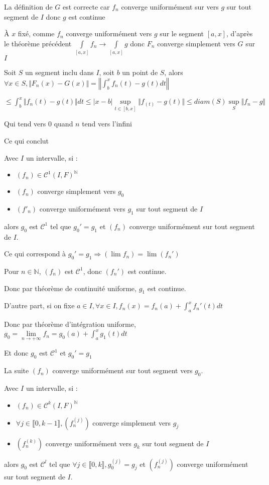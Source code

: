 \documentclass[a4paper,12pt]{book}
\newcommand{\Thr}[2]{\begin{tcolorbox}[sharp corners, colback=white,colframe=red!90!black!75, title=Théorème : #1]#2\end{tcolorbox}}
\newcommand{\Pre}[1]{\begin{tcolorbox}[sharp corners, colback=white,colframe=green!60!green!30!black!75, title=Preuve]#1\end{tcolorbox}}
\def\N{\mathbb{N}}
\begin{document}
\Pre{La définition de $G$ est correcte car $f_n$ converge uniformément sur vers $g$ sur tout segment de $I$ donc $g$ est continue
\par À $x$ fixé, comme $f_n$ converge uniformément vers $g$ sur le segment $[a,x]$, d'après le théorème précédent $\int\limits_{[a,x]}f_n\to \int\limits_{[a,x]}g$ donc $F_n$ converge simplement vers $G$ sur $I$
\par Soit $S$ un segment inclu dans $I$, soit $b$ un point de $S$, alors $\forall x\in S, \Vert F_n(x)-G(x)\Vert =\left\Vert\int_b^x f_n(t) - g(t) dt\right\Vert$ \par $\leq \int_b^x\Vert f_n(t)-g(t)\Vert dt\leq \vert x-b\vert \sup\limits_{t\in[b,x]}\Vert f_(t)-g(t)\Vert\leq diam(S)\sup\limits_{S}\Vert f_n-g\Vert$ \par Qui tend vers 0 quand $n$ tend vers l'infini \par Ce qui conclut}
\Thr{Dérivation uniforme des suites de fonctions}{Avec $I$ un intervalle, si :\begin{itemize}\item $(f_n)\in\mathcal{C}^1(I,F)^\N$ \item $(f_n)$ converge simplement vers $g_0$ \item $(f'_n)$ converge uniformément vers $g_1$ sur tout segment de $I$\end{itemize} alors $g_0$ est $\mathcal{C}^1$ tel que $g_0'=g_1$ et $(f_n)$ converge uniformément sur tout segment de $I$.
\par Ce qui correspond à $g_0'=g_1 \Rightarrow (\lim f_n)=\lim (f_n')$}
\Pre{Pour $n\in\N$, $(f_n)$ est $\mathcal{C}^1$, donc $(f_n')$ est continue. \par Donc par théorème de continuité uniforme, $g_1$ est continue. \par D'autre part, si on fixe $a\in I, \forall x\in I, f_n(x)=f_n(a)+\int_a^xf_n'(t)dt$ \par Donc par théorème d'intégration uniforme, $g_0=\lim\limits_{n\to+\infty}f_n=g_0(a)+\int_a^xg_1(t)dt$ \par Et donc $g_0$ est $\mathcal{C}^1$ et $g_0'=g_1$ \par La suite $(f_n)$ converge uniformément sur tout segment vers $g_0$.}
\Thr{Théorème de dérivation des suites à l'ordre k}{Avec $I$ un intervalle, si :\begin{itemize}\item $(f_n)\in\mathcal{C}^k(I,F)^\N$ \item $\forall j\in\llbracket0,k-1\rrbracket, (f_n^{(j)})$ converge simplement vers $g_j$ \item $(f_n^{(k)})$ converge uniformément vers $g_k$ sur tout segment de $I$\end{itemize} alors $g_0$ est $\mathcal{C}^l$ tel que $\forall j\in\llbracket0,k\rrbracket, g_0^{(j)}=g_j$ et $(f_n^{(j)})$ converge uniformément sur tout segment de $I$.}
\end{document}
